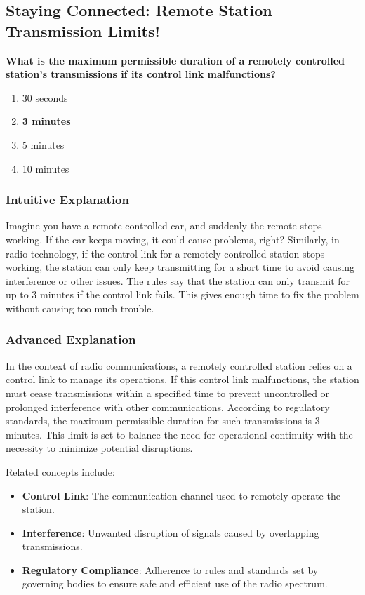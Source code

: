 \subsection{Staying Connected: Remote Station Transmission Limits!}
\label{sec:E1C08}

\begin{tcolorbox}[colback=gray!10!white,colframe=black!75!black,title={\textbf{E1C08}}]
\textbf{What is the maximum permissible duration of a remotely controlled station’s transmissions if its control link malfunctions?}
\begin{enumerate}[label=\Alph*),noitemsep]
    \item 30 seconds
    \item \textbf{3 minutes}
    \item 5 minutes
    \item 10 minutes
\end{enumerate}
\end{tcolorbox}

\subsubsection{Intuitive Explanation}
Imagine you have a remote-controlled car, and suddenly the remote stops working. If the car keeps moving, it could cause problems, right? Similarly, in radio technology, if the control link for a remotely controlled station stops working, the station can only keep transmitting for a short time to avoid causing interference or other issues. The rules say that the station can only transmit for up to 3 minutes if the control link fails. This gives enough time to fix the problem without causing too much trouble.

\subsubsection{Advanced Explanation}
In the context of radio communications, a remotely controlled station relies on a control link to manage its operations. If this control link malfunctions, the station must cease transmissions within a specified time to prevent uncontrolled or prolonged interference with other communications. According to regulatory standards, the maximum permissible duration for such transmissions is 3 minutes. This limit is set to balance the need for operational continuity with the necessity to minimize potential disruptions.


Related concepts include:
\begin{itemize}
    \item \textbf{Control Link}: The communication channel used to remotely operate the station.
    \item \textbf{Interference}: Unwanted disruption of signals caused by overlapping transmissions.
    \item \textbf{Regulatory Compliance}: Adherence to rules and standards set by governing bodies to ensure safe and efficient use of the radio spectrum.
\end{itemize}

